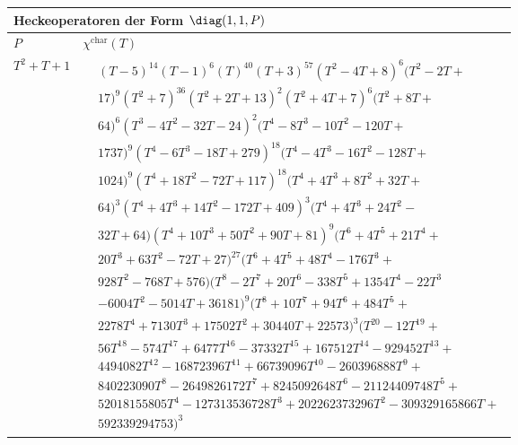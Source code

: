 \begin{tabular}{| l | l |}
\multicolumn{2}{l}{\bf Heckeoperatoren der Form $\diag(1,1,P)$} \\
\hline
$P$ & $\chi^\text{char}(T)$ \\
\hline
$T^2 + T + 1$ &
$\!\begin{aligned}
	&(T - 5)^{14}(T - 1)^{6}(T)^{40}(T + 3)^{57}(T^{2} - 4T + 8)^{6}(T^{2} - 2T + \\&
17)^{9}(T^{2} + 7)^{36}(T^{2} + 2T + 13)^{2}(T^{2} + 4T + 7)^{6}(T^{2} + 8T + \\&
64)^{6}(T^{3} - 4T^{2} - 32T - 24)^{2}(T^{4} - 8T^{3} - 10T^{2} - 120T + \\&
1737)^{9}(T^{4} - 6T^{3} - 18T + 279)^{18}(T^{4} - 4T^{3} - 16T^{2} - 128T + \\&
1024)^{9}(T^{4} + 18T^{2} - 72T + 117)^{18}(T^{4} + 4T^{3} + 8T^{2} + 32T + \\&
64)^{3}(T^{4} + 4T^{3} + 14T^{2} - 172T + 409)^{3}(T^{4} + 4T^{3} + 24T^{2} - \\&
32T + 64)(T^{4} + 10T^{3} + 50T^{2} + 90T + 81)^{9}(T^{6} + 4T^{5} + 21T^{4} + \\&
20T^{3} + 63T^{2} - 72T + 27)^{27}(T^{6} + 4T^{5} + 48T^{4} - 176T^{3} + \\&
928T^{2} - 768T + 576)(T^{8} - 2T^{7} + 20T^{6} - 338T^{5} + 1354T^{4} - 22T^{3}\\&
- 6004T^{2} - 5014T + 36181)^{9}(T^{8} + 10T^{7} + 94T^{6} + 484T^{5} + \\&
2278T^{4} + 7130T^{3} + 17502T^{2} + 30440T + 22573)^{3}(T^{20} - 12T^{19} + \\&
56T^{18} - 574T^{17} + 6477T^{16} - 37332T^{15} + 167512T^{14} - 929452T^{13} + \\&
4494082T^{12} - 16872396T^{11} + 66739096T^{10} - 260396888T^{9} + \\&
840223090T^{8} - 2649826172T^{7} + 8245092648T^{6} - 21124409748T^{5} + \\&
52018155805T^{4} - 127313536728T^{3} + 202262373296T^{2} - 309329165866T + \\&
592339294753)^{3}\end{aligned}$ \\
\hline
\end{tabular}


